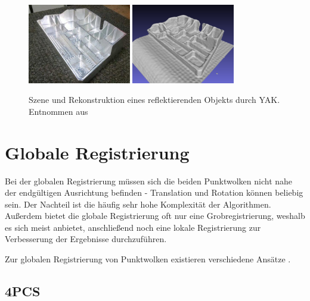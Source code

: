 \begin{figure}[ht]
	\centering
	\includegraphics[width=0.4\textwidth]{images/yak-reflecting-scene.jpg}
	\includegraphics[width=0.4\textwidth]{images/yak-reflecting-reconstruction.png}
	\caption{Szene und Rekonstruktion eines reflektierenden Objekts durch \ac{YAK}. Entnommen aus \cite{schornak2019yak}}
	\label{fig:yak-reflecting-model}
\end{figure}


\section{Globale Registrierung}
\label{sec:global-registration}

Bei der globalen Registrierung müssen sich die beiden Punktwolken nicht nahe der endgültigen Ausrichtung befinden - Translation und Rotation können beliebig sein.
Der Nachteil ist die häufig sehr hohe Komplexität der Algorithmen.
Außerdem bietet die globale Registrierung oft nur eine Grobregistrierung, weshalb es sich meist anbietet, anschließend noch eine lokale Registrierung zur Verbesserung der Ergebnisse durchzuführen.

Zur globalen Registrierung von Punktwolken existieren verschiedene Ansätze \cite{chaudhury2015global, zhou2016fast, rusu2009fast}.


\subsection{\acl{4PCS}}
\label{subsec:4pcs}

